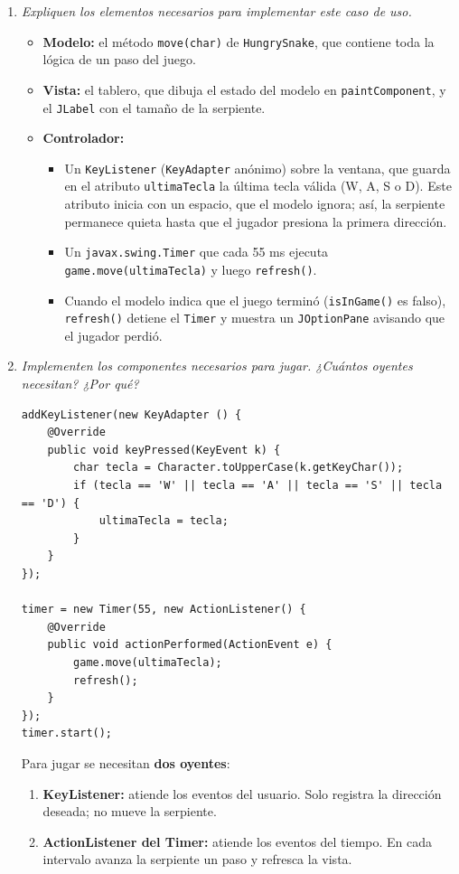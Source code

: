 \documentclass[12pt,letterpaper]{article}
\newcommand{\enunciado}[1]{\textit{#1}\par}
\begin{document}
\begin{enumerate}
  \item \enunciado{Expliquen los elementos necesarios para implementar este caso de uso.}

  \begin{itemize}
    \item \textbf{Modelo:} el método \texttt{move(char)} de \texttt{HungrySnake}, que contiene toda la lógica de un paso del juego.
    \item \textbf{Vista:} el tablero, que dibuja el estado del modelo en \texttt{paintComponent}, y el \texttt{JLabel} con el tamaño de la serpiente.
    \item \textbf{Controlador:}
    \begin{itemize}
      \item Un \texttt{KeyListener} (\texttt{KeyAdapter} anónimo) sobre la ventana, que guarda en el atributo \texttt{ultimaTecla} la última tecla válida (W, A, S o D). Este atributo inicia con un espacio, que el modelo ignora; así, la serpiente permanece quieta hasta que el jugador presiona la primera dirección.
      \item Un \texttt{javax.swing.Timer} que cada 55 ms ejecuta \texttt{game.move(ultimaTecla)} y luego \texttt{refresh()}.
      \item Cuando el modelo indica que el juego terminó (\texttt{isInGame()} es falso), \texttt{refresh()} detiene el \texttt{Timer} y muestra un \texttt{JOptionPane} avisando que el jugador perdió.
    \end{itemize}
  \end{itemize}

  \item \enunciado{Implementen los componentes necesarios para jugar. ¿Cuántos oyentes necesitan? ¿Por qué?}

\begin{lstlisting}
addKeyListener(new KeyAdapter () {
    @Override
    public void keyPressed(KeyEvent k) {
        char tecla = Character.toUpperCase(k.getKeyChar());
        if (tecla == 'W' || tecla == 'A' || tecla == 'S' || tecla == 'D') {
            ultimaTecla = tecla;
        }
    }
});

timer = new Timer(55, new ActionListener() {
    @Override
    public void actionPerformed(ActionEvent e) {
        game.move(ultimaTecla);
        refresh();
    }
});
timer.start();
\end{lstlisting}

  Para jugar se necesitan \textbf{dos oyentes}:
  \begin{enumerate}[label=\arabic*)]
    \item \textbf{KeyListener:} atiende los eventos del usuario. Solo registra la dirección deseada; no mueve la serpiente.
    \item \textbf{ActionListener del Timer:} atiende los eventos del tiempo. En cada intervalo avanza la serpiente un paso y refresca la vista.
  \end{enumerate}


\end{enumerate}
\end{document}
